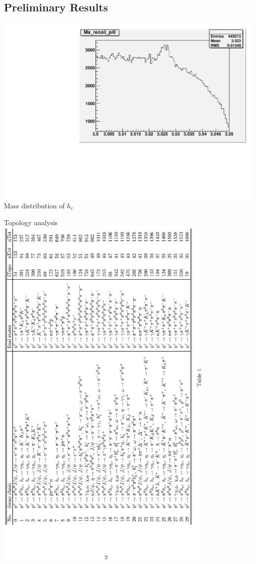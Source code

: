 \documentclass{beamer}
\begin{document}
\subsection{Preliminary Results}
\begin{frame}
\begin{center}
\includegraphics[width=0.8\textheight,angle=0]{figures/Pi0_recoil.pdf}\\
Mass distribution of $h_c$
\end{center}
\end{frame}
\begin{frame}{Topology analysis}
\vskip -1.5cm
\includegraphics[width=0.8\textwidth, angle=270]{figures/notice_recoil.eps}
\end{frame}
\end{document}
